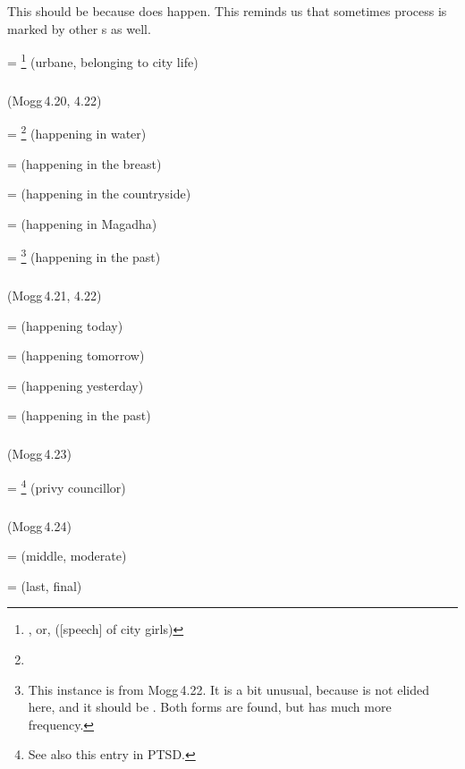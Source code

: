 This should be  because  does happen. This reminds us that sometimes  process is marked by other s as well.

 = \footnote{, or,  ([speech] of city girls)} (urbane, belonging to city life) \par

\subparagraph*{} (Mogg\,4.20, 4.22)\label{pacct2:dna}

 = \footnote{} (happening in water) \par
{} =  (happening in the breast) \par
{} =  (happening in the countryside) \par
{} =  (happening in Magadha) \par
{} = \footnote{This instance is from Mogg\,4.22. It is a bit unusual, because  is not elided here, and it should be . Both forms are found, but  has much more frequency.} (happening in the past) \par

\subparagraph*{} (Mogg\,4.21, 4.22)\label{pacct2:tana}

 =  (happening today) \par
{} =  (happening tomorrow) \par
{} =  (happening yesterday) \par
{} =  (happening in the past) \par

\subparagraph*{} (Mogg\,4.23)\label{pacct2:acca}

 = \footnote{See also this entry in PTSD.} (privy councillor) \par

\subparagraph*{} (Mogg\,4.24)\label{pacct2:ima}

 =  (middle, moderate) \par
{} =  (last, final) \par

